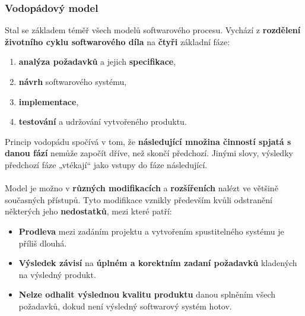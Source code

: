 \subsubsection{Vodopádový model}
Stal se základem téměř všech modelů softwarového procesu. Vychází z \textbf{rozdělení životního cyklu softwarového díla} na \textbf{čtyři} základní fáze:
\begin{enumerate}
\item \textbf{analýza požadavků} a jejich \textbf{specifikace},
\item \textbf{návrh} softwarového systému,
\item \textbf{implementace},
\item \textbf{testování} a udržování vytvořeného produktu.
\end{enumerate}
Princip vodopádu spočívá v tom, že \textbf{následující množina činností spjatá s danou fází} nemůže započít dříve, než skončí předchozí. Jinými slovy, výsledky předchozí fáze „vtékají“ jako vstupy do fáze následující.
\\\\
\noindent{}
Model je možno v \textbf{různých modifikacích} a \textbf{rozšířeních} nalézt ve většině současných přístupů. Tyto modifikace vznikly především kvůli odstranění některých jeho \textbf{nedostatků}, mezi které patří:
\begin{itemize}
\item \textbf{Prodleva} mezi zadáním projektu a vytvořením spustitelného systému je příliš dlouhá.
\item \textbf{Výsledek závisí} na \textbf{úplném a korektním zadaní požadavků} kladených na výsledný produkt.
\item \textbf{Nelze odhalit výslednou kvalitu produktu} danou splněním všech požadavků, dokud není výsledný softwarový systém hotov.
\end{itemize}

